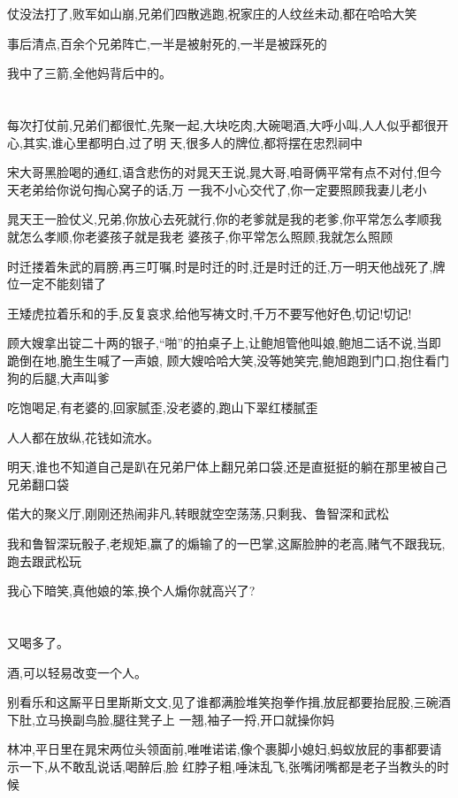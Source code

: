 ﻿\documentclass[12pt]{article}
\begin{document}
仗没法打了,败军如山崩,兄弟们四散逃跑,祝家庄的人纹丝未动,都在哈哈大笑

事后清点,百余个兄弟阵亡,一半是被射死的,一半是被踩死的

我中了三箭,全他妈背后中的。
\section{}

每次打仗前,兄弟们都很忙,先聚一起,大块吃肉,大碗喝酒,大呼小叫,人人似乎都很开心,其实,谁心里都明白,过了明
天,很多人的牌位,都将摆在忠烈祠中

宋大哥黑脸喝的通红,语含悲伤的对晁天王说,晁大哥,咱哥俩平常有点不对付,但今天老弟给你说句掏心窝子的话,万
一我不小心交代了,你一定要照顾我妻儿老小

晁天王一脸仗义,兄弟,你放心去死就行,你的老爹就是我的老爹,你平常怎么孝顺我就怎么孝顺,你老婆孩子就是我老
婆孩子,你平常怎么照顾,我就怎么照顾\dldots

时迁搂着朱武的肩膀,再三叮嘱,时是时迁的时,迁是时迁的迁,万一明天他战死了,牌位一定不能刻错了

王矮虎拉着乐和的手,反复哀求,给他写祷文时,千万不要写他好色,切记!切记!

顾大嫂拿出锭二十两的银子,``啪''的拍桌子上,让鲍旭管他叫娘,鲍旭二话不说,当即跪倒在地,脆生生喊了一声娘,
顾大嫂哈哈大笑,没等她笑完,鲍旭跑到门口,抱住看门狗的后腿,大声叫爹\dldots

吃饱喝足,有老婆的,回家腻歪,没老婆的,跑山下翠红楼腻歪

人人都在放纵,花钱如流水。

明天,谁也不知道自己是趴在兄弟尸体上翻兄弟口袋,还是直挺挺的躺在那里被自己兄弟翻口袋

偌大的聚义厅,刚刚还热闹非凡,转眼就空空荡荡,只剩我、鲁智深和武松

我和鲁智深玩骰子,老规矩,赢了的煽输了的一巴掌,这厮脸肿的老高,赌气不跟我玩,跑去跟武松玩

我心下暗笑,真他娘的笨,换个人煽你就高兴了?
\section{}

又喝多了。

酒,可以轻易改变一个人。

别看乐和这厮平日里斯斯文文,见了谁都满脸堆笑抱拳作揖,放屁都要抬屁股,三碗酒下肚,立马换副鸟脸,腿往凳子上
一翘,袖子一捋,开口就操你妈

林冲,平日里在晁宋两位头领面前,唯唯诺诺,像个裹脚小媳妇,蚂蚁放屁的事都要请示一下,从不敢乱说话,喝醉后,脸
红脖子粗,唾沫乱飞,张嘴闭嘴都是老子当教头的时候\dldots
\end{document}
